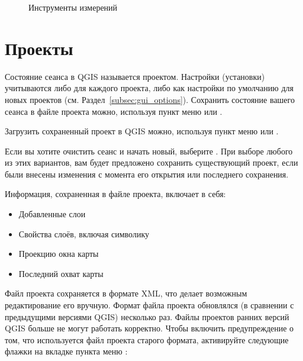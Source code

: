 \begin{figure}[ht]
\centering
     \hspace{0.33cm}
     \hspace{0.33cm}
   \caption{Инструменты измерений \nixcaption} \label{fig:measure}
\end{figure}


\section{Проекты}\label{sec:projects}

Состояние сеанса в QGIS называется проектом. Настройки (установки) учитываются либо
для каждого проекта, либо как настройки по умолчанию для новых проектов
(см. Раздел~\ref{subsec:gui_options}). Сохранить состояние
вашего сеанса в файле проекта можно, используя пункт меню
 \arrow {}
или  \arrow
{}.

Загрузить сохраненный проект в QGIS можно, используя пункт меню
 \arrow {}
или  \arrow {}.

Если вы хотите очистить сеанс и начать новый, выберите 
\arrow {}. При выборе любого
из этих вариантов, вам будет предложено сохранить существующий проект, если
были внесены изменения с момента его открытия или последнего сохранения.

Информация, сохраненная в файле проекта, включает в себя:

\begin{itemize}
\item Добавленные слои
\item Свойства слоёв, включая символику
\item Проекцию окна карты
\item Последний охват карты
\end{itemize}

Файл проекта сохраняется в формате XML, что делает возможным редактирование
его вручную. Формат файла проекта обновлялся (в сравнении с
предыдущими версиями QGIS) несколько раз. Файлы проектов ранних версий
QGIS больше не могут работать корректно. Чтобы включить предупреждение о том, что
используется файл проекта старого формата, активируйте следующие флажки на вкладке
 пункта меню  \arrow {}: \\

